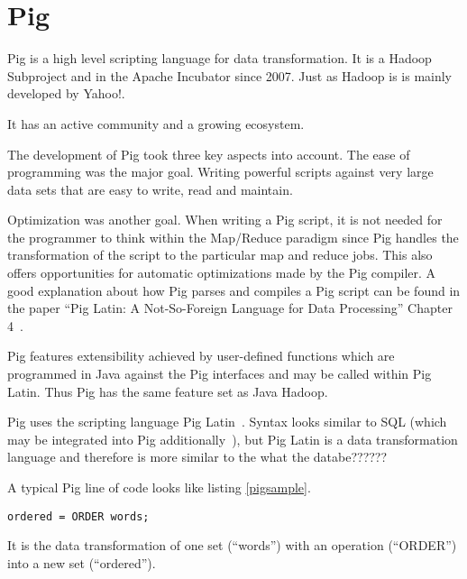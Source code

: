 \section{Pig}

Pig is a high level scripting language for data transformation. It is a Hadoop Subproject and in the Apache Incubator since 2007. Just as Hadoop is is mainly developed by Yahoo!. 

It has an active community and a growing ecosystem.

The development of Pig took three key aspects into account. The ease of programming was the major goal. Writing powerful scripts against very large data sets that are easy to write, read and maintain.~\cite{pigWebsite}

Optimization was another goal. When writing a Pig script, it is not needed for the programmer to think within the Map/Reduce paradigm since Pig handles the transformation of the script to the particular map and reduce jobs. This also offers opportunities for automatic optimizations made by the Pig compiler. A good explanation about how Pig parses and compiles a Pig script can be found in the paper ``Pig Latin: A Not-So-Foreign Language for Data Processing'' Chapter 4~\cite{pigNotForeign}.

Pig features extensibility achieved by user-defined functions which are programmed in Java against the Pig interfaces and may be called within Pig Latin. Thus Pig has the same feature set as Java Hadoop.

Pig uses the scripting language Pig Latin~\cite{pigManual}. Syntax looks similar to SQL (which may be integrated into Pig additionally~\cite{pigSql}), but Pig Latin is a data transformation language and therefore is more similar to the what the databe??????  

A typical Pig line of code looks like listing \ref{pigsample}.

\begin{lstlisting}[language=pig,caption=A typical Pig line of code,float,label=pigsample]
ordered = ORDER words;
\end{lstlisting}

It is the data transformation of one set (``words'') with an operation (``ORDER'') into a new set (``ordered'').
                                                                                                               